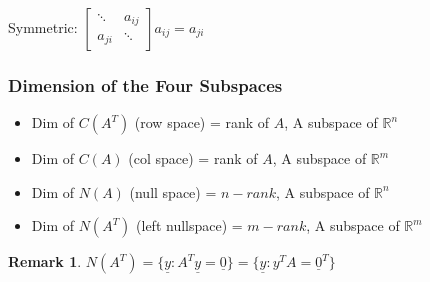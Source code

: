 \documentclass[12pt,a4paper]{article}
\newtheorem*{rem}{Remark}
\newcommand{\Remark}[1]{
  \begin{rem}
    \color{cyan}
    #1
  \end{rem}
}
\begin{document}
Symmetric:
$
\begin{bmatrix}
  \ddots & a_{ij} \\
  a_{ji} & \ddots
\end{bmatrix}
a_{ij} = a_{ji}
$

\subsubsection*{Dimension of the Four Subspaces}

\begin{itemize}
  \item Dim of $C(A^T)$ (row space) = rank of $A$, A subspace of $\mathbb{R}^n$
  \item Dim of $C(A)$ (col space) = rank of $A$, A subspace of $\mathbb{R}^m$
  \item Dim of $N(A)$ (null space) = $n - rank$, A subspace of $\mathbb{R}^n$
  \item Dim of $N(A^T)$ (left nullspace) = $m - rank$, A subspace of $\mathbb{R}^m$
\end{itemize}

\Remark{$N(A^T) = \{\underline{y}: A^T\underline{y} = \underline{0}\} = \{\underline{y}: y^TA = \underline{0}^T\}$}
\end{document}
